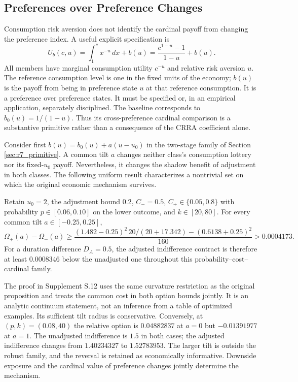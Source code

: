 \subsection{Preferences over Preference Changes}
\label{subsec:r8_cardinal}
Consumption risk aversion does not identify the cardinal payoff from changing the preference index. A useful explicit specification is
\begin{equation}
 U_b(c,u)=\int_1^c x^{-u}\,dx+b(u)
 =\frac{c^{1-u}-1}{1-u}+b(u).
 \label{eq:r8_metapreference}
\end{equation}
All members have marginal consumption utility $c^{-u}$ and relative risk aversion $u$. The reference consumption level is one in the fixed units of the economy; $b(u)$ is the payoff from being in preference state $u$ at that reference consumption. It is a preference over preference states. It must be specified or, in an empirical application, separately disciplined. The baseline corresponds to $b_0(u)=1/(1-u)$. Thus its cross-preference cardinal comparison is a substantive primitive rather than a consequence of the CRRA coefficient alone.

Consider first $b(u)=b_0(u)+a(u-u_0)$ in the two-stage family of Section \ref{sec:r7_primitive}. A common tilt $a$ changes neither class's consumption lottery nor its fixed-$u_0$ payoff. Nevertheless, it changes the shadow benefit of adjustment in both classes. The following uniform result characterizes a nontrivial set on which the original economic mechanism survives.

\begin{proposition}
\label{prop:r8_cardinal}
Retain $u_0=2$, the adjustment bound $0.2$, $C_-=0.5$, $C_+\in\{0.05,0.8\}$ with probability $p\in[0.06,0.10]$ on the lower outcome, and $k\in[20,80]$. For every common tilt $a\in[-0.25,0.25]$,
\begin{equation}
 \Omega_+(a)-\Omega_-(a)
 \geq \frac{(1.482-0.25)^2\,20/(20+17.342)
                    -(0.6138+0.25)^2}{160}
 >0.0004173.
 \label{eq:r8_cardinal_bound}
\end{equation}
For a duration difference $D_A=0.5$, the adjusted indifference contract is therefore at least $0.0008346$ below the unadjusted one throughout this probability--cost--cardinal family.
\end{proposition}

The proof in Supplement S.12 uses the same curvature restriction as the original proposition and treats the common cost in both option bounds jointly. It is an analytic continuum statement, not an inference from a table of optimized examples. Its sufficient tilt radius is conservative. Conversely, at $(p,k)=(0.08,40)$ the relative option is $0.04882837$ at $a=0$ but $-0.01391977$ at $a=1$. The unadjusted indifference is $1.5$ in both cases; the adjusted indifference changes from $1.40234327$ to $1.52783953$. The larger tilt is outside the robust family, and the reversal is retained as economically informative. Downside exposure and the cardinal value of preference changes jointly determine the mechanism.

